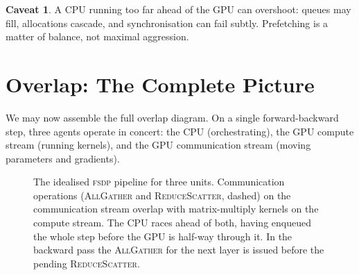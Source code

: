 \documentclass[11pt,a4paper]{article}
\theoremstyle{definition}
\newtheorem*{warning}{Caveat}
\theoremstyle{remark}
\newcommand{\FSDP}{\textsc{fsdp}}
\newcommand{\AllGather}{\textsc{AllGather}}
\newcommand{\ReduceScatter}{\textsc{ReduceScatter}}
\begin{document}
\begin{warning}
A CPU running too far ahead of the GPU can overshoot: queues may fill, allocations cascade, and synchronisation can fail subtly. Prefetching is a matter of balance, not maximal aggression.
\end{warning}

\section{Overlap: The Complete Picture}

We may now assemble the full overlap diagram. On a single forward-backward step, three agents operate in concert: the CPU (orchestrating), the GPU compute stream (running kernels), and the GPU communication stream (moving parameters and gradients).

\begin{figure}[ht]
\centering
{}
\caption{The idealised \FSDP{} pipeline for three units. Communication operations (\AllGather{} and \ReduceScatter{}, dashed) on the communication stream overlap with matrix-multiply kernels on the compute stream. The CPU races ahead of both, having enqueued the whole step before the GPU is half-way through it. In the backward pass the \AllGather{} for the next layer is issued before the pending \ReduceScatter{}.}
\label{fig:overlap}
\end{figure}
\end{document}
